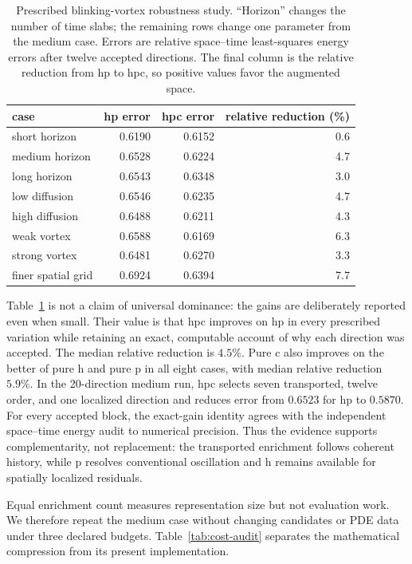 \documentclass[11pt]{article}
\numberwithin{algorithm}{section}
\theoremstyle{definition}\newtheorem{definition}[theorem]{Definition}
\theoremstyle{remark}\newtheorem{remark}[theorem]{Remark}
\begin{document}
\begin{table}[h]
\centering
\caption{Prescribed blinking-vortex robustness study.  ``Horizon'' changes the
number of time slabs; the remaining rows change one parameter from the medium
case.  Errors are relative space--time least-squares energy errors after twelve
accepted directions.  The final column is the relative reduction from hp to
hpc, so positive values favor the augmented space.}
\begin{tabular}{lrrr}
\toprule
case & hp error & hpc error & relative reduction (\%)\\
\midrule
short horizon & 0.6190 & 0.6152 & 0.6\\
medium horizon & 0.6528 & 0.6224 & 4.7\\
long horizon & 0.6543 & 0.6348 & 3.0\\
low diffusion & 0.6546 & 0.6235 & 4.7\\
high diffusion & 0.6488 & 0.6211 & 4.3\\
weak vortex & 0.6588 & 0.6169 & 6.3\\
strong vortex & 0.6481 & 0.6270 & 3.3\\
finer spatial grid & 0.6924 & 0.6394 & 7.7\\
\bottomrule
\end{tabular}
\label{tab:blinking-robustness}
\end{table}

Table~\ref{tab:blinking-robustness} is not a claim of universal dominance: the
gains are deliberately reported even when small.  Their value is that hpc
improves on hp in every prescribed variation while retaining an exact, computable
account of why each direction was accepted.  The median relative reduction is
$4.5\%$.  Pure c also improves on the better of pure h and pure p in all eight
cases, with median relative reduction $5.9\%$.  In the 20-direction medium
run, hpc selects seven transported, twelve order, and one localized direction
and reduces error from $0.6523$ for hp to $0.5870$.  For every accepted block,
the exact-gain identity agrees with the independent space--time energy audit to
numerical precision.  Thus the evidence supports complementarity, not
replacement: the transported enrichment follows coherent history, while p resolves
conventional oscillation and h remains available for spatially localized
residuals.

Equal enrichment count measures representation size but not evaluation work.
We therefore repeat the medium case without changing candidates or PDE data
under three declared budgets.  Table~\ref{tab:cost-audit} separates the
mathematical compression from its present implementation.
\end{document}
